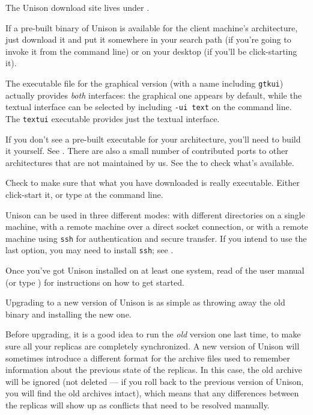 \documentclass{article}
\begin{document}

The Unison download site lives under 
.

If a pre-built binary of Unison is available for the client machine's
architecture, just download it and put it somewhere in your search
path (if you're going to invoke it from the command line) or on your
desktop (if you'll be click-starting it).

The executable file for the graphical version (with a name including
\verb|gtkui|) actually provides {\em both} interfaces: the graphical one
appears by default, while the textual interface can be selected by including
\verb|-ui text| on the command line.  The \verb|textui| executable
provides just the textual interface.

If you don't see a pre-built executable for your architecture, you'll
need to build it yourself.  See .
There are also a small number of contributed ports to other
architectures that are not maintained by us.  See the
 to check what's available.

Check to make sure that what you have downloaded is really executable.
Either click-start it, or type  at the command
line.  

Unison can be used in three different modes: with different directories on a
single machine, with a remote machine over a direct socket connection, or
with a remote machine using {\tt ssh} for authentication and secure
transfer.  If you intend to use the last option, you may need to install
{\tt ssh}; see .


Once you've got Unison installed on at least one system, read 
 of the user manual (or type ) for instructions on how to get started.



Upgrading to a new version of Unison is as simple as throwing away the old
binary and installing the new one.

Before upgrading, it is a good idea to run the {\em old} version one last
time, to make sure all your replicas are completely synchronized.  A new
version of Unison will sometimes introduce a different format for the
archive files used to remember information about the previous state of the
replicas.  In this case, the old archive will be ignored (not deleted --- if
you roll back to the previous version of Unison, you will find the old
archives intact), which means that any differences between the replicas will
show up as conflicts that need to be resolved manually.
\end{document}
